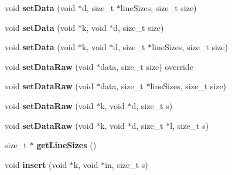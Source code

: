 \begin{DoxyCompactItemize}
\item 
\hypertarget{classfaster_1_1workerFdd_aeb6300f2d679b6b44693516d821c2b96}{}\label{classfaster_1_1workerFdd_aeb6300f2d679b6b44693516d821c2b96} 
void {\bfseries set\+Data} (void $\ast$d, size\+\_\+t $\ast$line\+Sizes, size\+\_\+t size)
\item 
\hypertarget{classfaster_1_1workerFdd_a168689aa68b6a02374d0f78ea0b2a3ed}{}\label{classfaster_1_1workerFdd_a168689aa68b6a02374d0f78ea0b2a3ed} 
void {\bfseries set\+Data} (void $\ast$k, void $\ast$d, size\+\_\+t size)
\item 
\hypertarget{classfaster_1_1workerFdd_ac399b11ae3a5a385acb52c2547baec51}{}\label{classfaster_1_1workerFdd_ac399b11ae3a5a385acb52c2547baec51} 
void {\bfseries set\+Data} (void $\ast$k, void $\ast$d, size\+\_\+t $\ast$line\+Sizes, size\+\_\+t size)
\item 
\hypertarget{classfaster_1_1workerFdd_abe1fe4ca054f914d12d2e24bd8ea49df}{}\label{classfaster_1_1workerFdd_abe1fe4ca054f914d12d2e24bd8ea49df} 
void {\bfseries set\+Data\+Raw} (void $\ast$data, size\+\_\+t size) override
\item 
\hypertarget{classfaster_1_1workerFdd_a60851f472a919037ae93c0ddf2fdbc4c}{}\label{classfaster_1_1workerFdd_a60851f472a919037ae93c0ddf2fdbc4c} 
void {\bfseries set\+Data\+Raw} (void $\ast$data, size\+\_\+t $\ast$line\+Sizes, size\+\_\+t size)
\item 
\hypertarget{classfaster_1_1workerFdd_af42e9fc7c5a824c63882b5fd6f494556}{}\label{classfaster_1_1workerFdd_af42e9fc7c5a824c63882b5fd6f494556} 
void {\bfseries set\+Data\+Raw} (void $\ast$k, void $\ast$d, size\+\_\+t s)
\item 
\hypertarget{classfaster_1_1workerFdd_a3247e1b4c7f74766d8f9bfb95ec35783}{}\label{classfaster_1_1workerFdd_a3247e1b4c7f74766d8f9bfb95ec35783} 
void {\bfseries set\+Data\+Raw} (void $\ast$k, void $\ast$d, size\+\_\+t $\ast$l, size\+\_\+t s)
\item 
\hypertarget{classfaster_1_1workerFdd_a121dcdce7e9348a0fc65b5880cb499b3}{}\label{classfaster_1_1workerFdd_a121dcdce7e9348a0fc65b5880cb499b3} 
size\+\_\+t $\ast$ {\bfseries get\+Line\+Sizes} ()
\item 
\hypertarget{classfaster_1_1workerFdd_a168e376cf191c14355f748526861962c}{}\label{classfaster_1_1workerFdd_a168e376cf191c14355f748526861962c} 
void {\bfseries insert} (void $\ast$k, void $\ast$in, size\+\_\+t s)
\item 
\hypertarget{classfaster_1_1workerFdd_af4ce92cd1a88a5a568df4cb8dd3429ae}{}\label{classfaster_1_1workerFdd_af4ce92cd1a88a5a568df4cb8dd3429ae} 

\end{DoxyCompactItemize}
